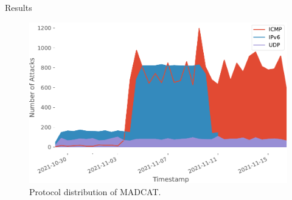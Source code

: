 \begin{frame}{Results}
    \begin{figure}
        \centering
        \includegraphics[width=\textwidth]{img/madcat-protocol-usage.pdf}
        \caption[Protocol distribution of MADCAT]{
            Protocol distribution of MADCAT.
        }
        \label{fig:madcat-protocols}
    \end{figure}
\end{frame}

